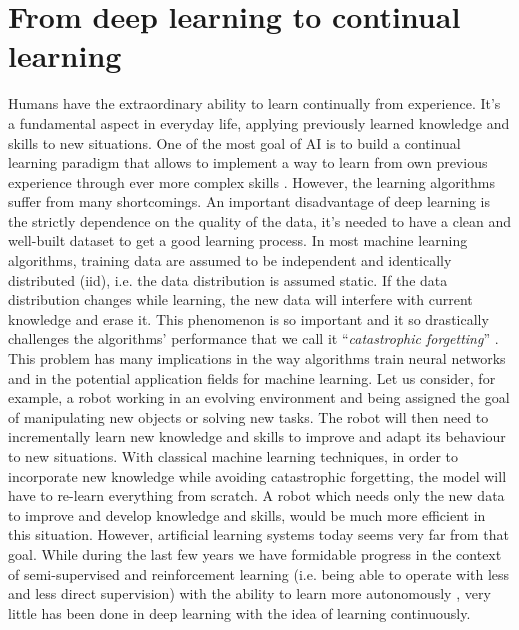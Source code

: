 \documentclass[english, LaM, oneside]{sapthesis}%
\begin{document}
\section{From deep learning to continual learning}
Humans have the extraordinary ability to learn continually from experience. It's a fundamental aspect in everyday life, applying previously learned knowledge and skills to new situations. One of the most goal of AI is to build a continual learning paradigm that allows to implement a way to learn from own previous experience through ever more complex skills  \cite{ring}.
\newline \newline
However, the learning algorithms suffer from many shortcomings. An important disadvantage of deep learning is the strictly dependence on the quality of the data, it's needed to have a clean and well-built dataset to get a good learning process. In most machine learning algorithms, training data are assumed to be independent and identically distributed (iid), i.e. the data distribution is assumed static. If the data distribution changes while learning, the new data will interfere with current knowledge and erase it. This phenomenon is so important and it so drastically challenges the algorithms’ performance that we call it “\textit{catastrophic forgetting}” \cite{cat_forgetting}. This problem has many implications in the way algorithms train neural networks and in the potential application fields for machine learning.
Let us consider, for example, a robot working in an evolving environment and being assigned the goal of manipulating new objects or solving new tasks. The robot will then need to incrementally learn new knowledge and skills to improve and adapt its behaviour to new situations. With classical machine learning techniques, in order to incorporate new knowledge while avoiding catastrophic forgetting, the model will have to re-learn everything from scratch. A robot which needs only the new data to improve and develop knowledge and skills, would be much more efficient in this situation.
\newline \newline
However, artificial learning systems today seems very far from that goal. While during the last few years we have formidable progress in the context of semi-supervised and reinforcement learning (i.e. being able to operate with less and less direct supervision) with the ability to learn more autonomously \cite{goodfellow, lecun}, very little has been done in deep learning with the idea of learning continuously.
\end{document}
